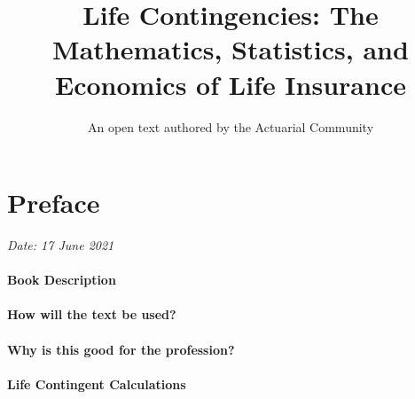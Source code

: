 \documentclass[
]{book}
\title{Life Contingencies: The Mathematics, Statistics, and Economics of Life Insurance}
\author{An open text authored by the Actuarial Community}
\date{}
\let\oldmaketitle\maketitle
\begin{document}
\maketitle

\thispagestyle{empty}
%

\let\maketitle\oldmaketitle
\maketitle

{
\setcounter{tocdepth}{2}
\tableofcontents
}
\hypertarget{preface}{%
\chapter*{Preface}\label{preface}}

\emph{Date: 17 June 2021}

\hypertarget{book-description}{%
\subsubsection*{Book Description}\label{book-description}}

\hypertarget{how-will-the-text-be-used}{%
\subsubsection*{How will the text be used?}\label{how-will-the-text-be-used}}

\hypertarget{why-is-this-good-for-the-profession}{%
\subsubsection*{Why is this good for the profession?}\label{why-is-this-good-for-the-profession}}

\hypertarget{life-contingent-calculations}{%
\subsubsection*{Life Contingent Calculations}\label{life-contingent-calculations}}
\end{document}

